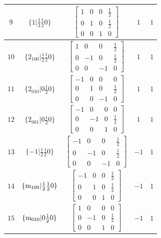 \documentclass[fleqn,8pt]{jsarticle}
\begin{document}
\begin{longtable}{ccccc}
$ 9 $ & $ \{1|\frac{1}{2} \frac{1}{2} 0\} $ & $ \begin{bmatrix} 1 & 0 & 0 & \frac{1}{2} \\ 0 & 1 & 0 & \frac{1}{2} \\ 0 & 0 & 1 & 0 \end{bmatrix} $ & $ 1 $ & $ 1 $ \\ \hline
$ 10 $ & $ \{2{}_{100}|\frac{1}{2} \frac{1}{2} 0\} $ & $ \begin{bmatrix} 1 & 0 & 0 & \frac{1}{2} \\ 0 & -1 & 0 & \frac{1}{2} \\ 0 & 0 & -1 & 0 \end{bmatrix} $ & $ 1 $ & $ 1 $ \\ \hline
$ 11 $ & $ \{2{}_{010}|0 \frac{1}{2} 0\} $ & $ \begin{bmatrix} -1 & 0 & 0 & 0 \\ 0 & 1 & 0 & \frac{1}{2} \\ 0 & 0 & -1 & 0 \end{bmatrix} $ & $ 1 $ & $ 1 $ \\ \hline
$ 12 $ & $ \{2{}_{001}|0 \frac{1}{2} 0\} $ & $ \begin{bmatrix} -1 & 0 & 0 & 0 \\ 0 & -1 & 0 & \frac{1}{2} \\ 0 & 0 & 1 & 0 \end{bmatrix} $ & $ 1 $ & $ 1 $ \\ \hline
$ 13 $ & $ \{-1|\frac{1}{2} \frac{1}{2} 0\} $ & $ \begin{bmatrix} -1 & 0 & 0 & \frac{1}{2} \\ 0 & -1 & 0 & \frac{1}{2} \\ 0 & 0 & -1 & 0 \end{bmatrix} $ & $ -1 $ & $ 1 $ \\ \hline
$ 14 $ & $ \{{\rm m}_{100}|\frac{1}{2} \frac{1}{2} 0\} $ & $ \begin{bmatrix} -1 & 0 & 0 & \frac{1}{2} \\ 0 & 1 & 0 & \frac{1}{2} \\ 0 & 0 & 1 & 0 \end{bmatrix} $ & $ -1 $ & $ 1 $ \\ \hline
$ 15 $ & $ \{{\rm m}_{010}|0 \frac{1}{2} 0\} $ & $ \begin{bmatrix} 1 & 0 & 0 & 0 \\ 0 & -1 & 0 & \frac{1}{2} \\ 0 & 0 & 1 & 0 \end{bmatrix} $ & $ -1 $ & $ 1 $ \\ \hline

\end{longtable}
\end{document}
